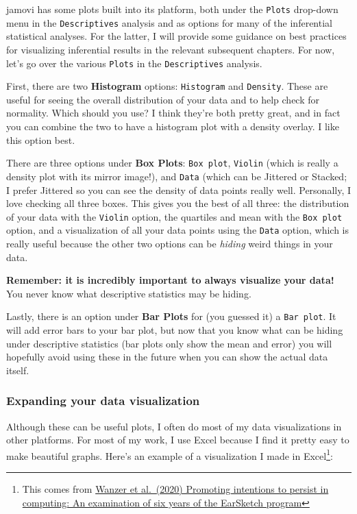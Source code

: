 \documentclass[
]{book}
\begin{document}
jamovi has some plots built into its platform, both under the \texttt{Plots} drop-down menu in the \texttt{Descriptives} analysis and as options for many of the inferential statistical analyses. For the latter, I will provide some guidance on best practices for visualizing inferential results in the relevant subsequent chapters. For now, let's go over the various \texttt{Plots} in the \texttt{Descriptives} analysis.

First, there are two \textbf{Histogram} options: \texttt{Histogram} and \texttt{Density}. These are useful for seeing the overall distribution of your data and to help check for normality. Which should you use? I think they're both pretty great, and in fact you can combine the two to have a histogram plot with a density overlay. I like this option best.

There are three options under \textbf{Box Plots}: \texttt{Box\ plot}, \texttt{Violin} (which is really a density plot with its mirror image!), and \texttt{Data} (which can be Jittered or Stacked; I prefer Jittered so you can see the density of data points really well. Personally, I love checking all three boxes. This gives you the best of all three: the distribution of your data with the \texttt{Violin} option, the quartiles and mean with the \texttt{Box\ plot} option, and a visualization of all your data points using the \texttt{Data} option, which is really useful because the other two options can be \emph{hiding} weird things in your data.

\textbf{Remember: it is incredibly important to always visualize your data!} You never know what descriptive statistics may be hiding.

Lastly, there is an option under \textbf{Bar Plots} for (you guessed it) a \texttt{Bar\ plot}. It will add error bars to your bar plot, but now that you know what can be hiding under descriptive statistics (bar plots only show the mean and error) you will hopefully avoid using these in the future when you can show the actual data itself.

\hypertarget{expanding-your-data-visualization}{%
\subsubsection{Expanding your data visualization}\label{expanding-your-data-visualization}}

Although these can be useful plots, I often do most of my data visualizations in other platforms. For most of my work, I use Excel because I find it pretty easy to make beautiful graphs. Here's an example of a visualization I made in Excel\footnote{This comes from \href{https://doi.org/10.1080/08993408.2020.1714313}{Wanzer et al.~(2020) Promoting intentions to persist in computing: An examination of six years of the EarSketch program}}:
\end{document}
